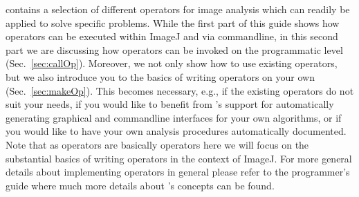 \mitobo contains a selection of different operators for image analysis which can readily 
be applied to solve specific problems. While the first part of this guide shows how operators 
can be executed within ImageJ and via commandline, in this second part we are discussing how 
operators can be invoked on the programmatic level (Sec.~\ref{sec:callOp}). 
Moreover, we not only show how to use existing
operators, but we also introduce you to the basics of writing operators on your own 
(Sec.~\ref{sec:makeOp}). This becomes
necessary, e.g., if the existing \mitobo operators do not suit your needs, if you
would like to benefit from \mitobo's support for automatically generating graphical and 
commandline interfaces for your own algorithms, or if you would like to have your own analysis 
procedures automatically documented. Note that as \mitobo operators are basically \alida operators 
here we will focus on the substantial basics of writing \mitobo operators in the context of 
ImageJ. For more general details about implementing operators in general please refer to the 
\alida programmer's guide where much more details about \alida's concepts can be found. 







